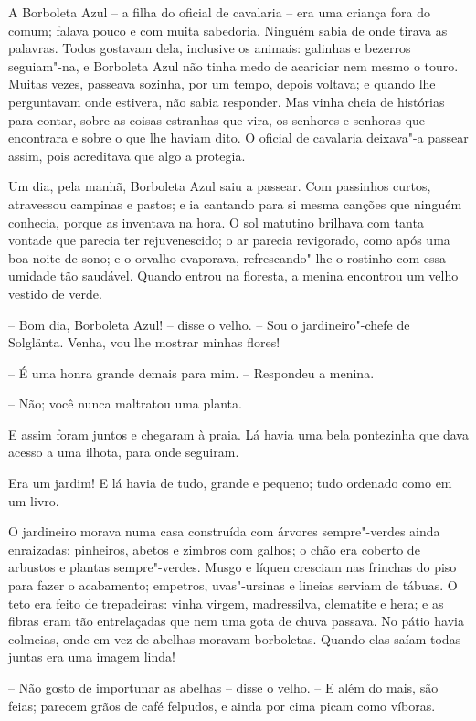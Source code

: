 A Borboleta Azul -- a filha do oficial de cavalaria -- era uma criança
fora do comum; falava pouco e com muita sabedoria. Ninguém sabia de
onde tirava as palavras. Todos gostavam dela, inclusive os animais:
galinhas e bezerros seguiam"-na, e Borboleta Azul não tinha medo de
acariciar nem mesmo o touro. Muitas vezes, passeava sozinha, por um
tempo, depois voltava; e quando lhe perguntavam onde estivera, não
sabia responder. Mas vinha cheia de histórias para contar, sobre as
coisas estranhas que vira, os senhores e senhoras que encontrara e
sobre o que lhe haviam dito. O oficial de cavalaria deixava"-a passear
assim, pois acreditava que algo a protegia.
\asterisc

Um dia, pela manhã, Borboleta Azul saiu a passear. Com passinhos curtos,
atravessou campinas e pastos; e ia cantando para si mesma canções que
ninguém conhecia, porque as inventava na hora. O sol matutino brilhava
com tanta vontade que parecia ter rejuvenescido; o ar parecia
revigorado, como após uma boa noite de sono; e o orvalho evaporava,
refrescando"-lhe o rostinho com essa umidade tão saudável. Quando
entrou na floresta, a menina encontrou um velho vestido de verde.

-- Bom dia, Borboleta Azul! -- disse o velho. -- Sou o jardineiro"-chefe
de Solglänta. Venha, vou lhe mostrar minhas flores!

-- É uma honra grande demais para mim. -- Respondeu a menina.

-- Não; você nunca maltratou uma planta.

E assim foram juntos e chegaram à praia. Lá havia uma bela pontezinha
que dava acesso a uma ilhota, para onde seguiram.

Era um jardim! E lá havia de tudo, grande e pequeno; tudo ordenado como
em um livro.

O jardineiro morava numa casa construída com árvores sempre"-verdes
ainda enraizadas: pinheiros, abetos e zimbros com galhos; o chão era
coberto de arbustos e plantas sempre"-verdes. Musgo e líquen cresciam
nas frinchas do piso para fazer o acabamento; empetros, uvas"-ursinas
e lineias serviam de tábuas. O teto era feito de trepadeiras: vinha
virgem, madressilva, clematite e hera; e as fibras eram tão
entrelaçadas que nem uma gota de chuva passava. No pátio havia
colmeias, onde em vez de abelhas moravam borboletas. Quando elas saíam
todas juntas era uma imagem linda!

-- Não gosto de importunar as abelhas -- disse o velho. -- E além do mais,
são feias; parecem grãos de café felpudos, e ainda por cima picam como
víboras.

